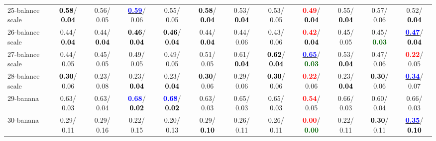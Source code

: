 \begin{table}[h]
\begin{center}
{\begin{tabular}{lc|c|c|c|c|c|c|c|c|c|c}
25-balance scale & \textcolor{black}{\textbf{  0.58}}/\textcolor{black}{\textbf{  0.04}} &   0.56/  0.05 & \underline{\textcolor{blue}{\textbf{  0.59}}}/  0.06 &   0.55/  0.05 & \textcolor{black}{\textbf{  0.58}}/\textcolor{black}{\textbf{  0.04}} &   0.53/\textcolor{black}{\textbf{  0.04}} &   0.53/  0.05 & \textcolor{red}{\textbf{  0.49}}/\textcolor{black}{\textbf{  0.04}} &   0.55/\textcolor{black}{\textbf{  0.04}} &   0.57/  0.06 &   0.52/\textcolor{black}{\textbf{  0.04}} \\
26-balance scale &   0.44/\textcolor{black}{\textbf{  0.04}} &   0.44/\textcolor{black}{\textbf{  0.04}} & \textcolor{black}{\textbf{  0.46}}/\textcolor{black}{\textbf{  0.04}} & \textcolor{black}{\textbf{  0.46}}/\textcolor{black}{\textbf{  0.04}} &   0.44/\textcolor{black}{\textbf{  0.04}} &   0.44/  0.06 &   0.43/  0.06 & \textcolor{red}{\textbf{  0.42}}/\textcolor{black}{\textbf{  0.04}} &   0.45/  0.05 &   0.45/\textcolor{darkgreen}{\textbf{  0.03}} & \underline{\textcolor{blue}{\textbf{  0.47}}}/\textcolor{black}{\textbf{  0.04}} \\
27-balance scale &   0.44/  0.05 &   0.45/  0.05 &   0.49/  0.05 &   0.49/  0.05 &   0.51/  0.05 &   0.61/\textcolor{black}{\textbf{  0.04}} & \textcolor{black}{\textbf{  0.62}}/\textcolor{black}{\textbf{  0.04}} & \underline{\textcolor{blue}{\textbf{  0.65}}}/\textcolor{darkgreen}{\textbf{  0.03}} &   0.53/\textcolor{black}{\textbf{  0.04}} &   0.47/  0.06 & \textcolor{red}{\textbf{  0.22}}/  0.05 \\
28-balance scale & \textcolor{black}{\textbf{  0.30}}/  0.06 &   0.23/  0.08 &   0.23/\textcolor{black}{\textbf{  0.04}} &   0.23/\textcolor{black}{\textbf{  0.04}} & \textcolor{black}{\textbf{  0.30}}/  0.06 &   0.29/  0.06 & \textcolor{black}{\textbf{  0.30}}/  0.06 & \textcolor{red}{\textbf{  0.22}}/  0.06 &   0.23/\textcolor{black}{\textbf{  0.04}} & \textcolor{black}{\textbf{  0.30}}/  0.06 & \underline{\textcolor{blue}{\textbf{  0.34}}}/  0.07 \\ \hline
29-banana &   0.63/  0.03 &   0.63/  0.04 & \textcolor{blue}{\textbf{  0.68}}/\textcolor{black}{\textbf{  0.02}} & \textcolor{blue}{\textbf{  0.68}}/\textcolor{black}{\textbf{  0.02}} &   0.63/  0.03 &   0.65/  0.03 &   0.65/  0.03 & \textcolor{red}{\textbf{  0.54}}/  0.05 &   0.66/  0.03 &   0.60/  0.04 &   0.66/  0.03 \\
30-banana &   0.29/  0.11 &   0.29/  0.16 &   0.22/  0.15 &   0.20/  0.13 &   0.29/\textcolor{black}{\textbf{  0.10}} &   0.26/  0.11 &   0.26/  0.11 & \textcolor{red}{\textbf{  0.00}}/\textcolor{darkgreen}{\textbf{  0.00}} &   0.22/  0.11 & \textcolor{black}{\textbf{  0.30}}/  0.11 & \underline{\textcolor{blue}{\textbf{  0.35}}}/\textcolor{black}{\textbf{  0.10}} \\

\end{tabular}}
\end{center}
\end{table}
